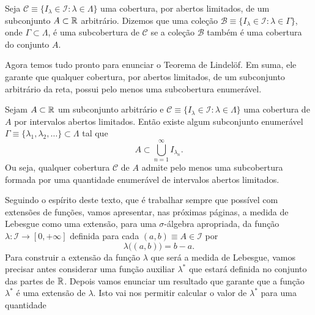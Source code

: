         Seja 
        $
        \mathscr{C}
        \equiv
        \{ I_{\lambda} \in \mathcal{I}: \lambda\in \Lambda\}
        $
        uma cobertura, por abertos limitados, de 
        um subconjunto $A\subset\mathbb{R}$ arbitrário. 
        Dizemos que uma coleção 
        $
        \mathscr{B}
        \equiv
        \{ I_{\lambda} \in \mathcal{I}: \lambda\in \Gamma\}
        $,
        onde $\Gamma\subset \Lambda$, é uma subcobertura de $\mathscr{C}$
        se a coleção $\mathscr{B}$ também é uma cobertura do conjunto $A$. 
    
        Agora temos tudo pronto para enunciar o Teorema de Lindel\"of. 
        Em suma, ele garante que qualquer cobertura, por abertos limitados, 
        de um subconjunto arbitrário da reta, possui pelo menos uma subcobertura enumerável. 
        \begin{teorema}
        \label{teo-lindelof}
            Sejam $A\subset\mathbb{R}$ um subconjunto arbitrário e 
            $\mathscr{C}\equiv \{I_{\lambda}\in \mathcal{I}: \lambda\in \Lambda\}$
            uma cobertura de $A$ por intervalos abertos limitados. 
            Então existe algum subconjunto enumerável 
            $\Gamma\equiv\{\lambda_1,\lambda_2,\ldots\}\subset \Lambda$
            tal que 
            \[
                A \subset \bigcup_{n=1}^{\infty} I_{\lambda_n}.
            \]
            Ou seja, qualquer cobertura $\mathscr{C}$ de $A$ admite pelo menos uma 
            subcobertura formada por uma quantidade enumerável de intervalos abertos limitados.
        \end{teorema}
        Seguindo o espírito deste texto, 
        que é trabalhar sempre que possível com extensões de funções, 
        vamos apresentar, nas próximas páginas, 
        a medida de Lebesgue como uma extensão, para uma $\sigma$-álgebra apropriada,
        da função $\lambda:\mathcal{I}\to [0,+\infty]$
        definida para cada $(a,b)\equiv A\in \mathcal{I}$ por
        \begin{equation}
        \label{def-func-lambda}
            \lambda\big((a,b)\big) = b-a.
        \end{equation}
        Para construir a extensão da função $\lambda$ que será a medida de Lebesgue,
        vamos precisar antes considerar uma função auxiliar $\lambda^*$
        que estará definida no conjunto das partes de $\mathbb{R}$. Depois
        vamos enunciar um resultado que garante que a função $\lambda^*$ é uma extensão de $\lambda$.
        Isto vai nos permitir calcular o valor de $\lambda^{*}$ para uma quantidade
